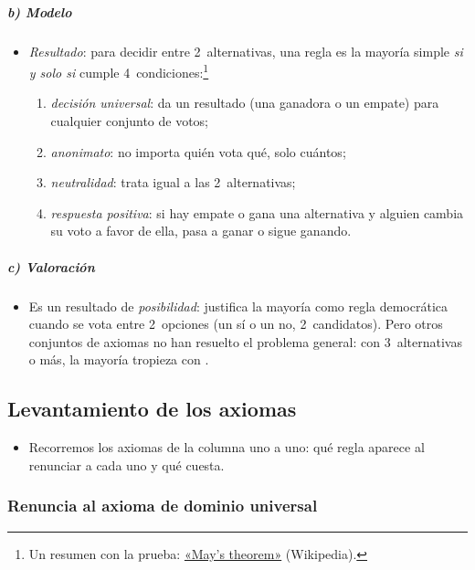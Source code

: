 \documentclass[11pt]{article}
\begin{document}
\subparagraph{b) Modelo}

\begin{itemize}
\item \emph{Resultado}: para decidir entre 2~alternativas, una regla es la mayoría simple \emph{si y solo si} cumple 4~condiciones\nocite{May1952Set}:\footnote{Un resumen con la prueba: \href{https://en.wikipedia.org/wiki/May\%27s_theorem}{«May's theorem»} (Wikipedia).}
  \begin{enumerate}
  \item \emph{decisión universal}: da un resultado (una ganadora o un empate) para cualquier conjunto de votos;
  \item \emph{anonimato}: no importa quién vota qué, solo cuántos;
  \item \emph{neutralidad}: trata igual a las 2~alternativas;
  \item \emph{respuesta positiva}: si hay empate o gana una alternativa y alguien cambia su voto a favor de ella, pasa a ganar o sigue ganando.
  \end{enumerate}
\end{itemize}

\subparagraph{c) Valoración}

\begin{itemize}
\item Es un resultado de \emph{posibilidad}: justifica la mayoría como regla democrática cuando se vota entre 2~opciones (un sí o un no, 2~candidatos). Pero otros conjuntos de axiomas no han resuelto el problema general: con 3~alternativas o más, la mayoría tropieza con .
\end{itemize}

\subsection{Levantamiento de los axiomas}\label{sec:axiomas}

\begin{itemize}
\item Recorremos los axiomas de la columna uno a uno: qué regla aparece al renunciar a cada uno y qué cuesta.
\end{itemize}

\subsubsection{Renuncia al axioma de dominio universal}\label{sec:renuncia-universalidad}
\end{document}
